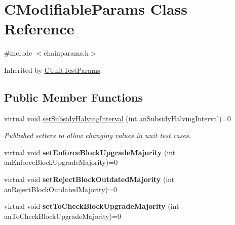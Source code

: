\hypertarget{class_c_modifiable_params}{}\section{C\+Modifiable\+Params Class Reference}
\label{class_c_modifiable_params}


{\ttfamily \#include $<$chainparams.\+h$>$}



Inherited by \mbox{\hyperlink{class_c_unit_test_params}{C\+Unit\+Test\+Params}}.

\subsection*{Public Member Functions}
\begin{DoxyCompactItemize}
\item 
\mbox{\label{class_c_modifiable_params_a267a442c10bffd3374c144a3b7f85109}} 
virtual void \mbox{\hyperlink{class_c_modifiable_params_a267a442c10bffd3374c144a3b7f85109}{set\+Subsidy\+Halving\+Interval}} (int an\+Subsidy\+Halving\+Interval)=0
\begin{DoxyCompactList}\small\item\em Published setters to allow changing values in unit test cases. \end{DoxyCompactList}\item 
\mbox{\label{class_c_modifiable_params_a314983948c2d20ec49988d7e3753d9a9}} 
virtual void {\bfseries set\+Enforce\+Block\+Upgrade\+Majority} (int an\+Enforce\+Block\+Upgrade\+Majority)=0
\item 
\mbox{\label{class_c_modifiable_params_ad0124c5aff51dbe59a2d7be188b704d3}} 
virtual void {\bfseries set\+Reject\+Block\+Outdated\+Majority} (int an\+Reject\+Block\+Outdated\+Majority)=0
\item 
\mbox{\label{class_c_modifiable_params_a27b175029965519f85c8d8ec97f21935}} 
virtual void {\bfseries set\+To\+Check\+Block\+Upgrade\+Majority} (int an\+To\+Check\+Block\+Upgrade\+Majority)=0
\item 
\mbox{\label{class_c_modifiable_params_a693968c09f6220f7e7f76f5e21a7b18a}} 

\end{DoxyCompactItemize}
